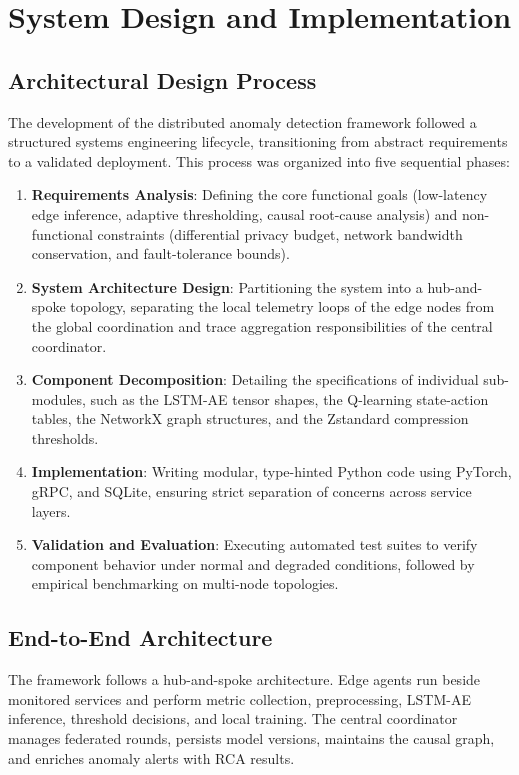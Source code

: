 \chapter{System Design and Implementation}
\label{ch:system_design}
\label{ch:reliability}
\section{Architectural Design Process}
\label{sec:design_process}

The development of the distributed anomaly detection framework followed a structured systems engineering lifecycle, transitioning from abstract requirements to a validated deployment. This process was organized into five sequential phases:
\begin{enumerate}
    \item \textbf{Requirements Analysis}: Defining the core functional goals (low-latency edge inference, adaptive thresholding, causal root-cause analysis) and non-functional constraints (differential privacy budget, network bandwidth conservation, and fault-tolerance bounds).
    \item \textbf{System Architecture Design}: Partitioning the system into a hub-and-spoke topology, separating the local telemetry loops of the edge nodes from the global coordination and trace aggregation responsibilities of the central coordinator.
    \item \textbf{Component Decomposition}: Detailing the specifications of individual sub-modules, such as the LSTM-AE tensor shapes, the Q-learning state-action tables, the NetworkX graph structures, and the Zstandard compression thresholds.
    \item \textbf{Implementation}: Writing modular, type-hinted Python code using PyTorch, gRPC, and SQLite, ensuring strict separation of concerns across service layers.
    \item \textbf{Validation and Evaluation}: Executing automated test suites to verify component behavior under normal and degraded conditions, followed by empirical benchmarking on multi-node topologies.
\end{enumerate}

\section{End-to-End Architecture}
\label{sec:design_architecture}

The framework follows a hub-and-spoke architecture. Edge agents run beside
monitored services and perform metric collection, preprocessing, LSTM-AE
inference, threshold decisions, and local training. The central coordinator
manages federated rounds, persists model versions, maintains the causal graph,
and enriches anomaly alerts with RCA results.

